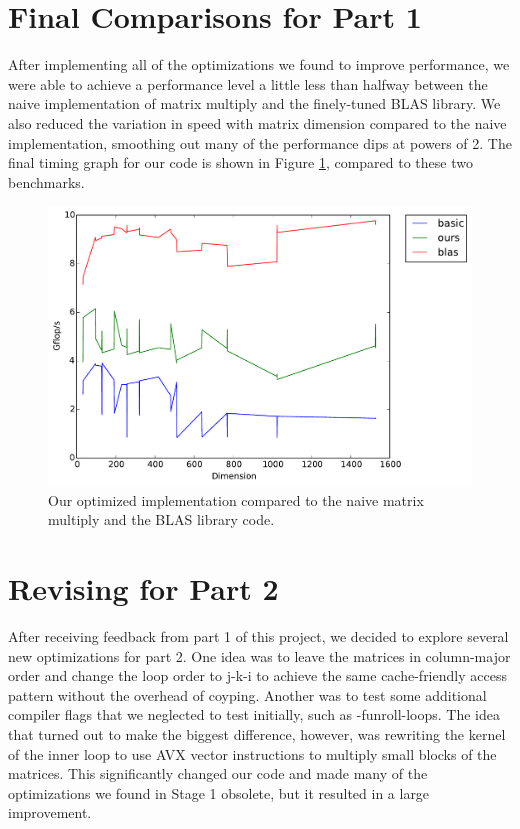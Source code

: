\documentclass[letterpaper]{article}	 %
\begin{document}
\section{Final Comparisons for Part 1}

After implementing all of the optimizations we found to improve performance, we were able to achieve a performance level a little less than halfway between the naive implementation of matrix multiply and the finely-tuned BLAS library. We also reduced the variation in speed with matrix dimension compared to the naive implementation, smoothing out many of the performance dips at powers of 2. 
The final timing graph for our code is shown in Figure \ref{fig:final}, compared to these two benchmarks.

\begin{figure}[H]
  \centering
  \includegraphics[width=.6\linewidth]{timing-final-comparison.pdf}
  \caption{Our optimized implementation compared to the naive matrix multiply and the BLAS library code.}
  \label{fig:final}
\end{figure}

\section{Revising for Part 2}

After receiving feedback from part 1 of this project, we decided to explore several new optimizations for part 2. One idea was to leave the matrices in column-major order and change the loop order to j-k-i to achieve the same cache-friendly access pattern without the overhead of coyping. Another was to test some additional compiler flags that we neglected to test initially, such as -funroll-loops. The idea that turned out to make the biggest difference, however, was rewriting the kernel of the inner loop to use AVX vector instructions to multiply small blocks of the matrices. This significantly changed our code and made many of the optimizations we found in Stage 1 obsolete, but it resulted in a large improvement.
\end{document}
